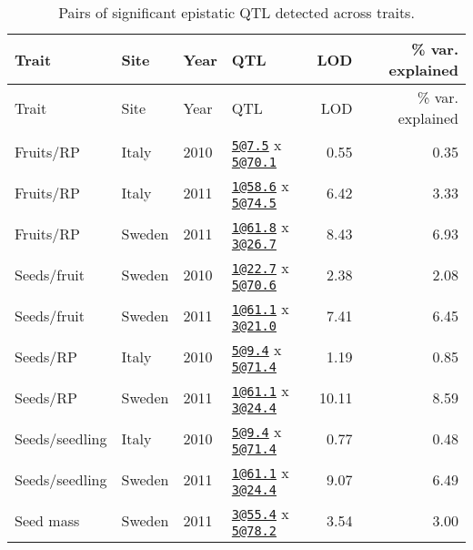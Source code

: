 \documentclass[]{article}
\begin{document}
\newpage

\begin{longtable}[]{@{}llllrr@{}}
\caption{\label{tab:epistatic-qtl-table}Pairs of significant epistatic QTL detected across traits.}\tabularnewline
\toprule
Trait & Site & Year & QTL & LOD & \% var. explained\tabularnewline
\midrule
\endfirsthead
\toprule
Trait & Site & Year & QTL & LOD & \% var. explained\tabularnewline
\midrule
\endhead
Fruits/RP & Italy & 2010 & \href{mailto:5@7.5}{\nolinkurl{5@7.5}} x \href{mailto:5@70.1}{\nolinkurl{5@70.1}} & 0.55 & 0.35\tabularnewline
Fruits/RP & Italy & 2011 & \href{mailto:1@58.6}{\nolinkurl{1@58.6}} x \href{mailto:5@74.5}{\nolinkurl{5@74.5}} & 6.42 & 3.33\tabularnewline
Fruits/RP & Sweden & 2011 & \href{mailto:1@61.8}{\nolinkurl{1@61.8}} x \href{mailto:3@26.7}{\nolinkurl{3@26.7}} & 8.43 & 6.93\tabularnewline
Seeds/fruit & Sweden & 2010 & \href{mailto:1@22.7}{\nolinkurl{1@22.7}} x \href{mailto:5@70.6}{\nolinkurl{5@70.6}} & 2.38 & 2.08\tabularnewline
Seeds/fruit & Sweden & 2011 & \href{mailto:1@61.1}{\nolinkurl{1@61.1}} x \href{mailto:3@21.0}{\nolinkurl{3@21.0}} & 7.41 & 6.45\tabularnewline
Seeds/RP & Italy & 2010 & \href{mailto:5@9.4}{\nolinkurl{5@9.4}} x \href{mailto:5@71.4}{\nolinkurl{5@71.4}} & 1.19 & 0.85\tabularnewline
Seeds/RP & Sweden & 2011 & \href{mailto:1@61.1}{\nolinkurl{1@61.1}} x \href{mailto:3@24.4}{\nolinkurl{3@24.4}} & 10.11 & 8.59\tabularnewline
Seeds/seedling & Italy & 2010 & \href{mailto:5@9.4}{\nolinkurl{5@9.4}} x \href{mailto:5@71.4}{\nolinkurl{5@71.4}} & 0.77 & 0.48\tabularnewline
Seeds/seedling & Sweden & 2011 & \href{mailto:1@61.1}{\nolinkurl{1@61.1}} x \href{mailto:3@24.4}{\nolinkurl{3@24.4}} & 9.07 & 6.49\tabularnewline
Seed mass & Sweden & 2011 & \href{mailto:3@55.4}{\nolinkurl{3@55.4}} x \href{mailto:5@78.2}{\nolinkurl{5@78.2}} & 3.54 & 3.00\tabularnewline
\bottomrule
\end{longtable}

\newpage
\end{document}
